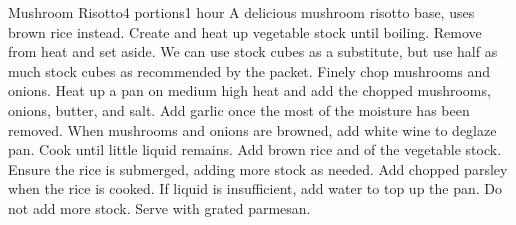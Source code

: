 \begin{recipe}[MushroomRisotto]{Mushroom Risotto}{4 portions}{1 hour}
    \freeform A delicious mushroom risotto base, uses brown rice instead.
    Create and heat up vegetable stock until boiling. Remove from heat and set aside. We can use stock cubes as a substitute, but use half as much stock cubes as recommended by the packet.
    Finely chop mushrooms and onions. Heat up a pan on medium high heat and add the chopped mushrooms, onions, butter, and salt.
    Add garlic once the most of the moisture has been removed. When mushrooms and onions are browned, add white wine to deglaze pan. Cook until little liquid remains. 
    Add brown rice and  of the vegetable stock. Ensure the rice is submerged, adding more stock as needed.
    Add chopped parsley when the rice is cooked. If liquid is insufficient, add water to top up the pan. Do not add more stock.
    Serve with grated parmesan.
    \freeform\hrulefill
\end{recipe}